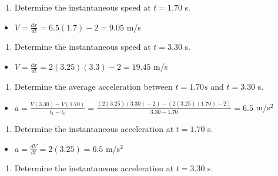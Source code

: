 \documentclass[
  letterpaper,
  DIV=11,
  numbers=noendperiod]{scrartcl}
\providecommand{\tightlist}{%
  \setlength{\itemsep}{0pt}\setlength{\parskip}{0pt}}\usepackage{longtable,booktabs,array}
\begin{document}
\begin{enumerate}
\def\labelenumi{(\alph{enumi})}
\setcounter{enumi}{1}
\tightlist
\item
  Determine the instantaneous speed at \(t = 1.70\) s.
\end{enumerate}

\begin{itemize}
\tightlist
\item
  \(V = \frac{dx}{dt} = 6.5(1.7)-2 = 9.05\) m/s
\end{itemize}

\begin{enumerate}
\def\labelenumi{(\alph{enumi})}
\setcounter{enumi}{2}
\tightlist
\item
  Determine the instantaneous speed at \(t = 3.30\) s.
\end{enumerate}

\begin{itemize}
\tightlist
\item
  \(V = \frac{dx}{dt} = 2(3.25)(3.3)-2 = 19.45\) m/s
\end{itemize}

\begin{enumerate}
\def\labelenumi{(\alph{enumi})}
\setcounter{enumi}{3}
\tightlist
\item
  Determine the average acceleration between \(t = 1.70 s\) and
  \(t = 3.30\) s.
\end{enumerate}

\begin{itemize}
\tightlist
\item
  \(\bar{a} = \frac{V(3.30)-V(1.70)}{t_1-t_0} = \frac{(2(3.25)(3.30)-2)-(2(3.25)(1.70)-2)}{3.30-1.70} = 6.5\)
  m/s\(^2\)
\end{itemize}

\begin{enumerate}
\def\labelenumi{(\alph{enumi})}
\setcounter{enumi}{4}
\tightlist
\item
  Determine the instantaneous acceleration at \(t = 1.70\) s.
\end{enumerate}

\begin{itemize}
\tightlist
\item
  \(a = \frac{dV}{dt} = 2(3.25) = 6.5\) m/s\(^2\)
\end{itemize}

\begin{enumerate}
\def\labelenumi{(\alph{enumi})}
\setcounter{enumi}{5}
\tightlist
\item
  Determine the instantaneous acceleration at \(t = 3.30\) s.
\end{enumerate}
\end{document}
